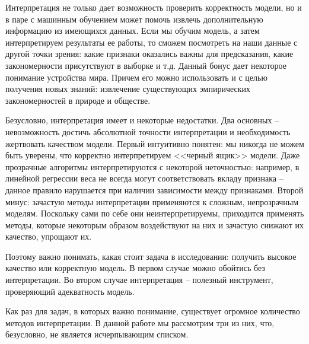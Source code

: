 Интерпретация не только дает возможность проверить корректность модели, но и в паре с машинным обучением может помочь извлечь дополнительную информацию из имеющихся данных. Если мы обучим модель, а затем интерпретируем результаты ее работы, то сможем посмотреть на наши данные с другой точки зрения: какие признаки оказались важны для предсказания, какие закономерности присутствуют в выборке и т.д. Данный бонус дает некоторое понимание устройства мира. Причем его можно использовать и с целью получения новых знаний: извлечение существующих эмпирических закономерностей в природе и обществе.

Безусловно, интерпретация имеет и некоторые недостатки. Два основных -- невозможность достичь абсолютной точности интерпретации и необходимость жертвовать качеством модели. Первый интуитивно понятен: мы никогда не можем быть уверены, что корректно интерпретируем <<черный ящик>> модели. Даже прозрачные алгоритмы интерпретируются с некоторой неточностью: например, в линейной регрессии веса не всегда могут соответствовать вкладу признака -- данное правило нарушается при наличии зависимости между признаками. Второй минус: зачастую методы интерпретации применяются к сложным, непрозрачным моделям. Поскольку сами по себе они неинтерпретируемы, приходится применять методы, которые некоторым образом воздействуют на них и зачастую снижают их качество, упрощают их.

Поэтому важно понимать, какая стоит задача в исследовании: получить высокое качество или корректную модель. В первом случае можно обойтись без интерпретации. Во втором случае интерпретация -- полезный инструмент, проверяющий адекватность модель.

Как раз для задач, в которых важно понимание, существует огромное количество методов интерпретации. В данной работе мы рассмотрим три из них, что, безусловно, не является исчерпывающим списком.